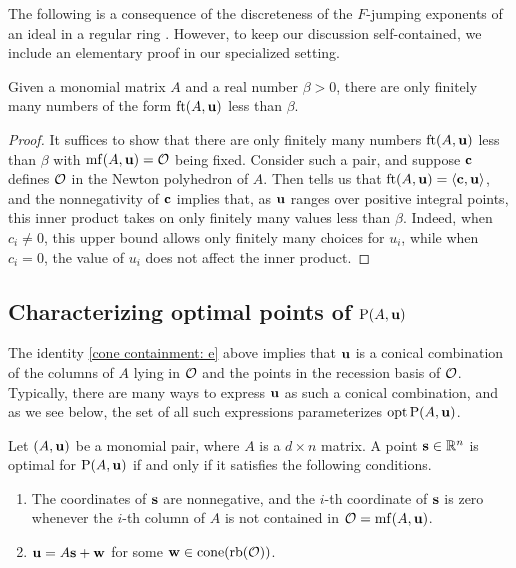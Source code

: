 \documentclass[11pt]{amsart}
\begin{document}
The following is a consequence of the discreteness of the $F$-jumping exponents of an ideal in a regular ring \cite[Theorem~3.1]{blickle+mustata+smith.discr_rat_FPTs}.
However, to keep our discussion self-contained, we include an elementary proof in our specialized setting.

\begin{proposition}
\label{discreteness: L}
Given a monomial matrix $A$ and a real number $\beta > 0 $, there are only finitely many numbers of the form $\operatorname{ft}(A, \mathbf{u})$ less than $\beta$.    
\end{proposition}

\begin{proof}
   It suffices to show that there are only finitely many numbers $\operatorname{ft}(A, \mathbf{u})$ less than $\beta$ with $\operatorname{mf}(A, \mathbf{u}) = \mathcal{O}$ being fixed.
   Consider such a pair, and suppose $\mathbf{c}$ defines $\mathcal{O}$ in the Newton polyhedron of $A$.
   Then  tells us that $\operatorname{ft}(A, \mathbf{u}) = \langle \mathbf{c}, \mathbf{u} \rangle$, and the nonnegativity of $\mathbf{c}$ implies that, as $\mathbf{u}$ ranges over positive integral points, this inner product takes on only finitely many values less than $\beta$.
   Indeed, when $c_i \ne 0$, this upper bound allows only finitely many choices for $u_i$, while when $c_i = 0$, the value of $u_i$ does not affect the inner product.
\end{proof}

\subsection{Characterizing optimal points of $\mathrm{P}(A,\mathbf{u})$}

The identity \eqref{cone containment: e} above implies that 
$\mathbf{u}$ is a conical combination of the columns of $A$ lying in $\mathcal{O}$ and the points in the recession basis of $\mathcal{O}$.
Typically, there are many ways to express $\mathbf{u}$ as such a conical combination, and as we see below, the set of all such expressions parameterizes  $\operatorname{opt} \mathrm{P}(A, \mathbf{u})$.

\begin{proposition}\label{opt set: P}
   Let $(A,\mathbf{u})$ be a monomial pair, where $A$ is a $d\times n$ matrix.
   A point $\mathbf{s} \in \mathbb{R}^n$ is optimal for $\mathrm{P}(A, \mathbf{u})$ if and only if it satisfies the following conditions.
\begin{enumerate}
\item  \label{mc coords: e} The coordinates of $\mathbf{s}$ are nonnegative, and the $i$-th coordinate of $\mathbf{s}$ is zero whenever the $i$-th column of $A$ is not contained in $\mathcal{O} = \operatorname{mf}(A, \mathbf{u})$.
\item  \label{mc decomposition: e} $\mathbf{u} = A \mathbf{s} + \mathbf{w}$ for some $\mathbf{w} \in  \operatorname{cone}(\operatorname{rb}(\mathcal{O}))$.   
\end{enumerate}
\end{proposition}
\end{document}
